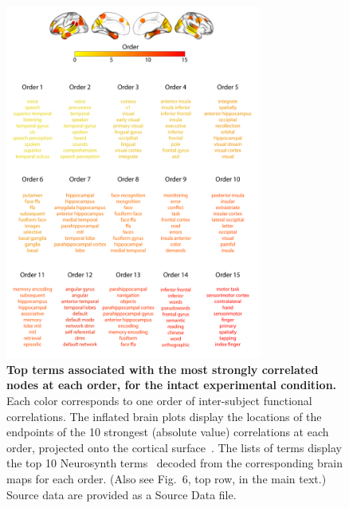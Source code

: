 \documentclass[english]{article}
\newcommand{\neurosynth}{6}
\begin{document}
\begin{figure}[p!]
\centering
\includegraphics[width=0.75\textwidth]{figs/supp_15_intact}
\caption{\textbf{Top terms associated with the most strongly
      correlated nodes at each order, for the intact experimental
    condition.}  Each color corresponds to one order of inter-subject
functional correlations. The inflated brain plots display the
locations of the endpoints of the 10 strongest (absolute value)
correlations at each order, projected onto the cortical
surface~\citep{CombEtal19}.  The lists of terms display
the top 10 Neurosynth terms~\citep{RubiEtal17} decoded from the
corresponding brain maps for each order.  (Also see Fig.~\neurosynth,
top row, in the main text.) Source data are provided as a Source Data file.}
\label{fig:intact}
\end{figure}
\end{document}
